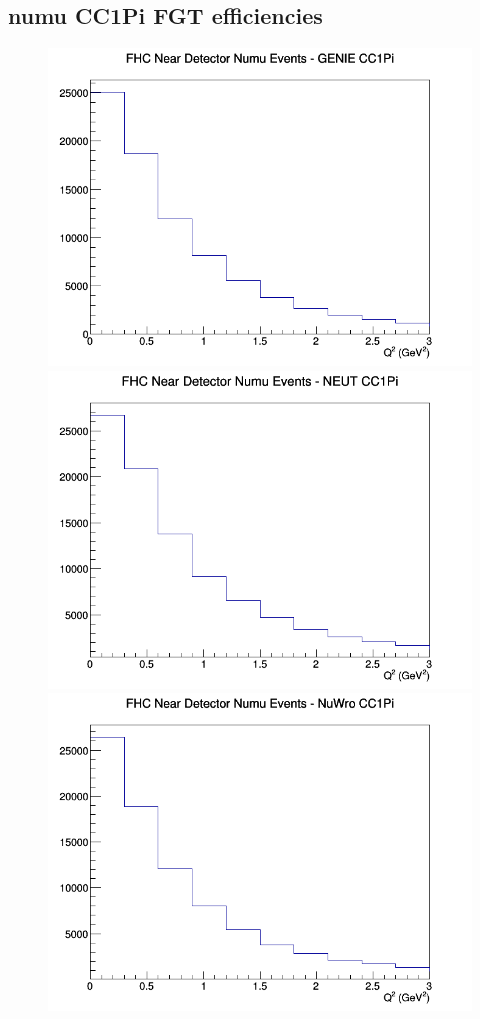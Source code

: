 \subsection{numu CC1Pi FGT efficiencies}
\begin{figure}[h]
\includegraphics[width=\linewidth]{eff_Q2/FGT/CC1Pi_FHC_ND_numu_Q2_GENIE.png}
\endminipage
{}
\includegraphics[width=\linewidth]{eff_Q2/FGT/CC1Pi_FHC_ND_numu_Q2_NEUT.png}
\endminipage
{}
\includegraphics[width=\linewidth]{eff_Q2/FGT/CC1Pi_FHC_ND_numu_Q2_NuWro.png}

\end{figure}
